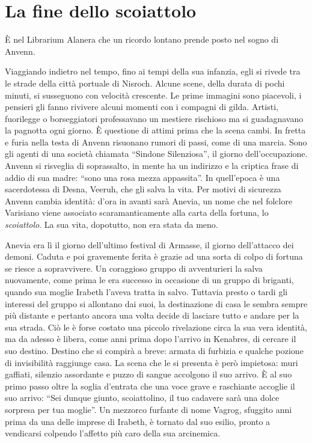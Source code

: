 \chapter{La fine dello scoiattolo}
\label{chp:cap3}

\`E nel Librarium Alanera che un ricordo lontano prende posto nel sogno di Anvenn. 

Viaggiando indietro nel tempo, fino ai tempi della sua infanzia, egli si rivede tra le strade della citt\`a portuale di Nisroch. Alcune scene, della durata di pochi minuti, si susseguono con velocit\`a crescente. Le prime immagini sono piacevoli, i pensieri gli fanno rivivere alcuni momenti con i compagni di gilda. Artisti, fuorilegge o borseggiatori professavano un mestiere rischioso ma si guadagnavano la pagnotta ogni giorno. \`E questione di attimi prima che la scena cambi. In fretta e furia nella testa di Anvenn risuonano rumori di passi, come di una marcia. Sono gli agenti di una societ\`a chiamata ``Sindone Silenziosa'', il giorno dell'occupazione. Anvenn si risveglia di soprassalto, in mente ha un indirizzo e la criptica frase di addio di sua madre: ``sono una rosa mezza appassita''. In quell'epoca \`e una sacerdotessa di Desna, Veeruh, che gli salva la vita. Per motivi di sicurezza Anvenn cambia identit\`a: d'ora in avanti sar\`a Anevia, un nome che nel folclore Varisiano viene associato scaramanticamente alla carta della fortuna, lo \emph{scoiattolo}. La sua vita, dopotutto, non era stata da meno.

Anevia era l\`i il giorno dell'ultimo festival di Armasse, il giorno dell'attacco dei demoni. Caduta e poi gravemente ferita \`e grazie ad una sorta di colpo di fortuna se riesce a sopravvivere. Un coraggioso gruppo di avventurieri la salva nuovamente, come prima le era successo in occasione di un gruppo di briganti, quando sua moglie Irabeth l'aveva tratta in salvo. Tuttavia presto o tardi gli interessi del gruppo si allontano dai suoi, la destinazione di casa le sembra sempre pi\`u distante e pertanto ancora una volta decide di lasciare tutto e andare per la sua strada. Ci\`o le \`e forse costato una piccolo rivelazione circa la sua vera identit\`a, ma da adesso \`e libera, come anni prima dopo l'arrivo in Kenabres, di cercare il suo destino. Destino che si compir\`a a breve: armata di furbizia e qualche pozione di invisibilit\`a raggiunge casa. La scena che le si presenta \`e per\`o impietosa: muri gaffiati, silenzio assordante e puzzo di sangue accolgono il suo arrivo. \`E al suo primo passo oltre la soglia d'entrata che una voce grave e raschiante accoglie il suo arrivo: ``Sei dunque giunto, scoiattolino, il tuo cadavere sar\`a una dolce sorpresa per tua moglie''. Un mezzorco furfante di nome Vagrog, sfuggito anni prima da una delle imprese di Irabeth, \`e tornato dal suo esilio, pronto a vendicarsi colpendo l'affetto pi\`u caro della sua arcinemica.

